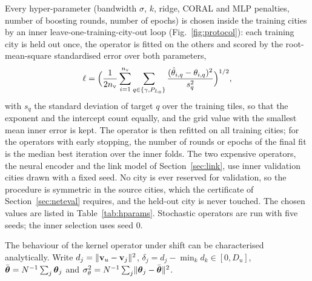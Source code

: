 Every hyper-parameter (bandwidth $\sigma$, $k$, ridge, CORAL and MLP
penalties, number of boosting rounds, number of epochs) is chosen inside the
training cities by an inner leave-one-training-city-out loop
(Fig.~\ref{fig:protocol}): each training city is held out once, the operator
is fitted on the others and scored by the root-mean-square standardised
error over both parameters,
\begin{equation}
\ell=\Bigl(\frac{1}{2n_{\mathrm{v}}}\sum_{i=1}^{n_{\mathrm{v}}}\sum_{q\in\{\gamma,P_{L_0}\}}
\frac{(\hat\theta_{i,q}-\theta_{i,q})^{2}}{s_q^{2}}\Bigr)^{1/2},
\label{eq:selloss}
\end{equation}
with $s_q$ the standard deviation of target $q$ over the training tiles, so
that the exponent and the intercept count equally, and the grid value with
the smallest mean inner error is kept. The operator is then refitted on all
training cities; for the operators with early stopping, the number of
rounds or epochs of the final fit is the median best iteration over the
inner folds. The two expensive operators, the neural encoder and the link
model of Section~\ref{sec:link}, use \nInnerExpensive{} inner validation
cities drawn with a fixed seed. No city is ever reserved for validation, so
the procedure is symmetric in the source cities, which the certificate of
Section~\ref{sec:neteval} requires, and the held-out city is never touched.
The chosen values are listed in Table~\ref{tab:hparams}. Stochastic
operators are run with five seeds; the inner selection uses seed 0.

The behaviour of the kernel operator under shift can be characterised
analytically. Write $d_j=\lVert\mathbf{v}_u-\mathbf{v}_j\rVert^{2}$,
$\delta_j=d_j-\min_k d_k\in[0,D_u]$, $\bar{\boldsymbol{\theta}}=N^{-1}\sum_j\boldsymbol{\theta}_j$ and
$\sigma_\theta^{2}=N^{-1}\sum_j\lVert\boldsymbol{\theta}_j-\bar{\boldsymbol{\theta}}\rVert^{2}$.

